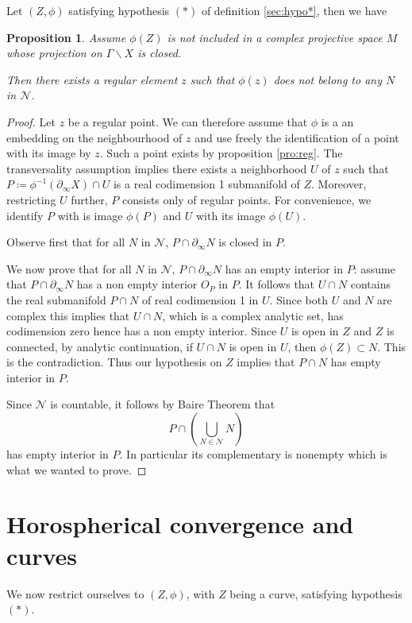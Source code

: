 \documentclass[12pt,reqno]{amsart}
\newtheorem{proposition}[theorem]{Proposition}
\newcommand{\mc}{\mathcal}
\newcommand{\defeq}{\coloneqq}
\newcommand{\bX}{\partial_\infty X}
\begin{document}
Let $(Z,\phi)$ satisfying hypothesis $(*)$ of definition \ref{sec:hypo*}, then we have
\begin{proposition}\label{pro:regnotin}
	Assume $\phi(Z)$ is not included in a complex projective space $M$ whose projection on $\Gamma\backslash X$ is closed.
	
	Then there exists a regular element $z$ such that $\phi(z)$ does not belong to any  $N$ in $\mathcal N$.
\end{proposition}

\begin{proof} Let $z$ be a regular point. We can therefore assume that $\phi$ is a an embedding on the neighbourhood of $z$ and use freely the identification of a point with its image by $z$. Such a point exists by proposition \ref{pro:reg}. The transversality assumption implies there exists a neighborhood $U$ of $z$ such that $P\defeq\phi^{-1}(\bX)\cap U$ is a real codimension 1 submanifold  of $Z$. Moreover, restricting $U$ further, $P$ consists only of regular points.  For convenience, we  identify $P$ with is image $\phi(P)$ and $U$ with its image $\phi(U)$.

Observe first that for all $N$ in $\mc N$,  $P\cap \partial_\infty N$  is closed in $P$.

We now  prove that for all $N$ in $\mc N$,  $P\cap \partial_\infty N$   has an empty interior in $P$: assume that $P\cap  \partial_\infty N$ has a non empty interior $O_P$ in $P$. It follows that  $U\cap N$  contains the  real submanifold $P\cap N$ of real codimension 1 in $U$. Since both $U$ and $N$ are complex this implies that $U\cap N$, which is a complex analytic set, has codimension zero hence has a non empty interior.  Since $U$ is open in $Z$ and $Z$ is connected, by analytic continuation, if $U\cap N$ is  open in $U$, then $\phi(Z)\subset N$. This is the contradiction. Thus our hypothesis on $Z$ implies that  $P\cap N$  has empty interior in $P$.  

Since $\mc N$ is countable,  it follows by Baire Theorem  that 
$$
P\cap\left(\bigcup_{N\in\mc N} N\right)
$$
has empty interior in $P$. In particular its complementary is  nonempty which is what we wanted to prove.
\end{proof}

\section{Horospherical convergence and curves}
We now restrict ourselves to $(Z,\phi)$, with $Z$ being a curve, satisfying hypothesis $(*)$.
\end{document}
